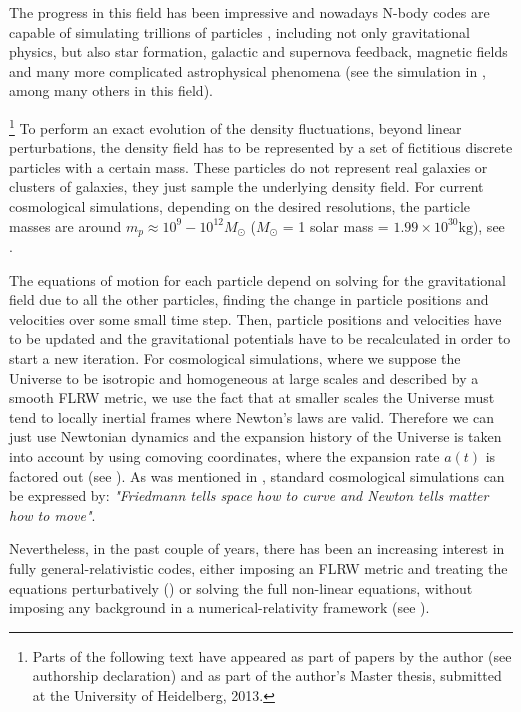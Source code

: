 The progress in this field has been impressive and nowadays N-body codes are capable
of simulating trillions of particles \cite{vogelsberger2014introducing, lawrence_coyote_2010, rasera_introducing_2010-2,alimi_deus_2012}, including not only 
gravitational physics, but also star formation, galactic and supernova feedback, magnetic fields and
many more complicated astrophysical phenomena (see the simulation in \cite{vogelsberger2014introducing}, among many others in this field).

\footnote{Parts of the following text have appeared as part of papers by the author (see authorship declaration)
and as part of the author's Master thesis, submitted at the University of Heidelberg, 2013.}
To perform an exact evolution of the density fluctuations, beyond
linear perturbations, the density field has to be represented by a
set of fictitious discrete particles with a certain mass. These particles
do not represent real galaxies or clusters of galaxies, they just
sample the underlying density field. For current cosmological simulations,
depending on the desired resolutions, the particle masses are around
$m_{p}\approx10^{9}-10^{12}M_{\odot}$ ($M_{\odot}$ = 1 solar mass = $1.99 \times 10^{30} \mathrm{kg}$), see \cite{kuhlen_numerical_2012}.


The equations of motion for each particle depend on solving for the
gravitational field due to all the other particles, finding the change
in particle positions and velocities over some small time step. Then,
particle positions and velocities have to be updated and the gravitational
potentials have to be recalculated in order to start a new iteration. For cosmological
simulations, where we suppose the Universe to be isotropic and homogeneous
at large scales and described by a smooth FLRW metric, we use the
fact that at smaller scales the Universe must tend to locally inertial
frames where Newton's laws are valid. Therefore we can just use Newtonian
dynamics and the expansion history of the Universe is taken into account
by using comoving coordinates, where the expansion rate $a(t)$ is
factored out (see \cite{peacock_cosmological_1999,dehnen_n-body_2011}).
As was mentioned in \cite{coley2017computational}, standard cosmological simulations
can be expressed by:
\emph{"Friedmann tells space how to curve and Newton tells matter how to move"}.

Nevertheless, in the past couple of years, there has been an increasing interest
in fully general-relativistic codes, either imposing an FLRW metric and treating the equations
perturbatively (\cite{adamek2016gevolution}) or solving the full non-linear 
equations, without imposing any background in a numerical-relativity framework (see \cite{giblin_jr_departures_2016}).



